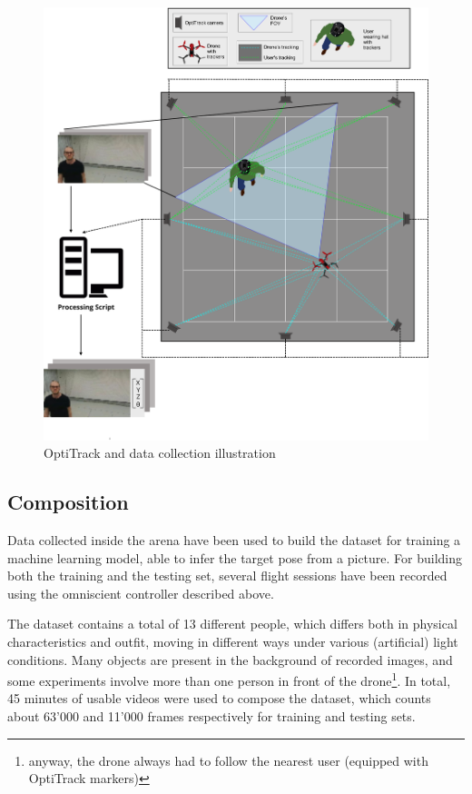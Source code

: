 \begin{figure}[!htb]
	\centering
	\includegraphics[width=1\textwidth]{"contents/images/03-arena-demo-2"}
	\caption[OptiTrack and data collection illustration]{OptiTrack and data collection illustration \cite{mantegazza2018thesis}}
	\label{fig:drone-demo-2}
\end{figure}



\subsection{Composition}
\label{subsec:dataset-composition}

Data collected inside the arena have been used to build the dataset for training a machine learning model, able to infer the target pose from a picture. For building both the training and the testing set, several flight sessions have been recorded using the omniscient controller described above. 

The dataset contains a total of 13 different people, which differs both in physical characteristics and outfit, moving in different ways under various (artificial) light conditions. Many objects are present in the background of recorded images, and some experiments involve more than one person in front of the drone\footnote{anyway, the drone always had to follow the nearest user (equipped with OptiTrack markers)}. In total, 45 minutes of usable videos were used to compose the dataset, which counts about 63'000 and 11'000 frames respectively for training and testing sets.

